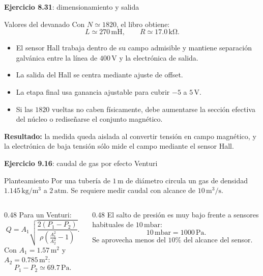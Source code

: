 \documentclass[aspectratio=169,9pt]{beamer}
\newcommand{\exercise}[1]{\textbf{Ejercicio #1}}
\newcommand{\result}[1]{\textbf{\color{eiTeal}Resultado:} #1}
\newcommand{\unit}[1]{\,\mathrm{#1}}
\begin{document}
\begin{frame}{\exercise{8.31}: dimensionamiento y salida}
  \begin{block}{Valores del devanado}
    Con \(N\simeq1820\), el libro obtiene:
    \[
      L\simeq270\unit{mH},
      \qquad
      R\simeq17.0\unit{k\Omega}.
    \]
  \end{block}

  \begin{itemize}
    \item El sensor Hall trabaja dentro de su campo admisible y mantiene separación galvánica entre la línea de \(400\unit{V}\) y la electrónica de salida.
    \item La salida del Hall se centra mediante ajuste de offset.
    \item La etapa final usa ganancia ajustable para cubrir \(-5\) a \(5\unit{V}\).
    \item Si las \(1820\) vueltas no caben físicamente, debe aumentarse la sección efectiva del núcleo o rediseñarse el conjunto magnético.
  \end{itemize}

  \result{la medida queda aislada al convertir tensión en campo magnético, y la electrónica de baja tensión sólo mide el campo mediante el sensor Hall.}
\end{frame}

\begin{frame}{\exercise{9.16}: caudal de gas por efecto Venturi}
  \begin{block}{Planteamiento}
    Por una tubería de \(1\unit{m}\) de diámetro circula un gas de densidad \(1.145\unit{kg/m^3}\) a \(2\unit{atm}\). Se requiere medir caudal con alcance de \(10\unit{m^3/s}\).
  \end{block}

  \begin{columns}[T,onlytextwidth]
    \begin{column}{0.48\textwidth}
      Para un Venturi:
      \[
        Q=A_1
        \sqrt{\frac{2(P_1-P_2)}
        {\rho\left(\frac{A_1^2}{A_2^2}-1\right)}}.
      \]
      Con \(A_1=1.57\unit{m^2}\) y \(A_2=0.785\unit{m^2}\):
      \[
        P_1-P_2\simeq69.7\unit{Pa}.
      \]
    \end{column}
    \begin{column}{0.48\textwidth}
      El salto de presión es muy bajo frente a sensores habituales de \(10\unit{mbar}\):
      \[
        10\unit{mbar}=1000\unit{Pa}.
      \]
      Se aprovecha menos del \(10\%\) del alcance del sensor.
    \end{column}
  \end{columns}
\end{frame}
\end{document}
